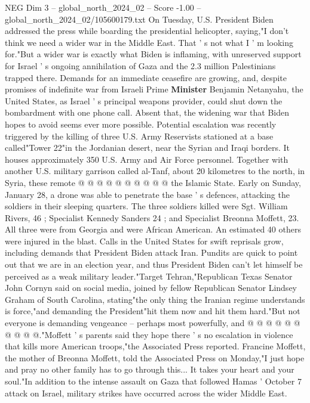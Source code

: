 \begin{textsample}{NEG Dim 3 – global\_north\_2024\_02 – Score -1.00 – global\_north\_2024\_02/105600179.txt}  \label{ex:f3_neg_206}
On Tuesday, U.S.
President Biden addressed the press while boarding the presidential helicopter, saying,"I don't think we need a wider war in the Middle East.
That ' s not what I ' m looking for."But a wider war is exactly what Biden is inflaming, with unreserved support for Israel ' s ongoing annihilation of Gaza and the 2.3 million Palestinians trapped there.
Demands for an immediate ceasefire are growing, and, despite promises of indefinite war from Israeli Prime \textbf{Minister} Benjamin Netanyahu, the United States, as Israel ' s principal weapons provider, could shut down the bombardment with one phone call.
Absent that, the widening war that Biden hopes to avoid seems ever more possible.
Potential escalation was recently triggered by the killing of three U.S.
Army Reservists stationed at a base called"Tower 22"in the Jordanian desert, near the Syrian and Iraqi borders.
It houses approximately 350 U.S.
Army and Air Force personnel.
Together with another U.S. military garrison called al-Tanf, about 20 kilometres to the north, in Syria, these remote @ @ @ @ @ @ @ @ @ @ the Islamic State.
Early on Sunday, January 28, a drone was able to penetrate the base ' s defences, attacking the soldiers in their sleeping quarters.
The three soldiers killed were Sgt.
William Rivers, 46 ; Specialist Kennedy Sanders 24 ; and Specialist Breonna Moffett, 23.
All three were from Georgia and were African American.
An estimated 40 others were injured in the blast.
Calls in the United States for swift reprisals grow, including demands that President Biden attack Iran.
Pundits are quick to point out that we are in an election year, and thus President Biden can't let himself be perceived as a weak military leader."Target Tehran,"Republican Texas Senator John Cornyn said on social media, joined by fellow Republican Senator Lindsey Graham of South Carolina, stating"the only thing the Iranian regime understands is force,"and demanding the President"hit them now and hit them hard."But not everyone is demanding vengeance -- perhaps most powerfully, and @ @ @ @ @ @ @ @ @ @."Moffett ' s parents said they hope there ' s no escalation in violence that kills more American troops,"the Associated Press reported.
Francine Moffett, the mother of Breonna Moffett, told the Associated Press on Monday,"I just hope and pray no other family has to go through this...
It takes your heart and your soul."In addition to the intense assault on Gaza that followed Hamas ' October 7 attack on Israel, military strikes have occurred across the wider Middle East.

\end{textsample}
